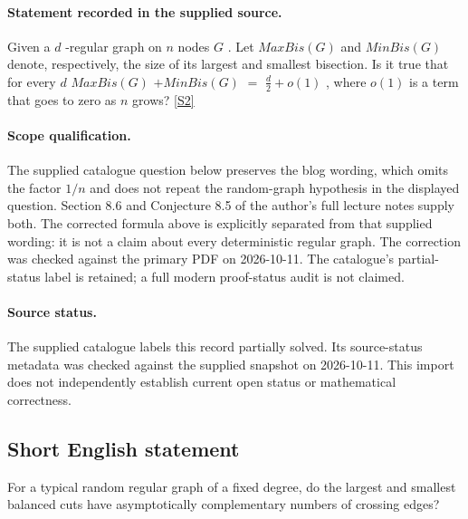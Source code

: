 \documentclass[11pt]{article}
\begin{document}
\paragraph{Statement recorded in the supplied source.}
Given a $d$ -regular graph on $n$ nodes $G$ . Let $MaxBis(G)$ and $MinBis(G)$ denote, respectively, the size of its largest and smallest bisection. Is it true that for every $d$ $MaxBis(G)$ $+ MinBis(G)$ $=$ $\frac{d}{2} + o(1)$ , where $o(1)$ is a term that goes to zero as $n$ grows? \href{https://afonsobandeira.wordpress.com/2015/12/04/10l42pmaxcut/}{[S2]}
\paragraph{Scope qualification.}
The supplied catalogue question below preserves the blog wording, which omits the factor $1/n$ and does not repeat the random-graph hypothesis in the displayed question. Section 8.6 and Conjecture 8.5 of the author's full lecture notes supply both. The corrected formula above is explicitly separated from that supplied wording: it is not a claim about every deterministic regular graph. The correction was checked against the primary PDF on 2026-10-11. The catalogue's partial-status label is retained; a full modern proof-status audit is not claimed.
\paragraph{Source status.}
The supplied catalogue labels this record partially solved. Its source-status metadata was checked against the supplied snapshot on 2026-10-11. This import does not independently establish current open status or mathematical correctness.
\subsection{Short English statement}
For a typical random regular graph of a fixed degree, do the largest and smallest balanced cuts have asymptotically complementary numbers of crossing edges?
\end{document}
